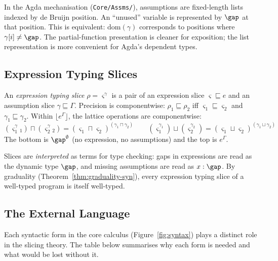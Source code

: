 \begin{remark}\label{rem:assms-mechanisation}
In the Agda mechanisation (\texttt{Core/Assms/}), assumptions are fixed-length lists indexed by de Bruijn position. An ``unused'' variable is represented by $\gap$ at that position. This is equivalent: $\mathrm{dom}(\gamma)$ corresponds to positions where $\gamma[i] \neq \gap$. The partial-function presentation is cleaner for exposition; the list representation is more convenient for Agda's dependent types.
\end{remark}

\subsection{Expression Typing Slices}
\label{sec:expression-typing-slices}

An \textit{expression typing slice} $\rho = \varsigma^\gamma$ is a pair of an expression slice $\varsigma \sqsubseteq e$ and an assumption slice $\gamma \sqsubseteq \Gamma$. Precision is componentwise: $\rho_1 \sqsubseteq \rho_2$ iff $\varsigma_1 \sqsubseteq \varsigma_2$ and $\gamma_1 \sqsubseteq \gamma_2$. Within $\lfloor e^\Gamma \rfloor$, the lattice operations are componentwise:
\[(\varsigma_1^\gamma_1) \sqcap (\varsigma_2^\gamma_2) = (\varsigma_1 \sqcap \varsigma_2)^{(\gamma_1 \sqcap \gamma_2)} \qquad (\varsigma_1^{\gamma_1}) \sqcup (\varsigma_2^{\gamma_2}) = (\varsigma_1 \sqcup \varsigma_2)^{(\gamma_1 \sqcup \gamma_2)}\]
The bottom is $\gap^\emptyset$ (no expression, no assumptions) and the top is $e^\Gamma$.

Slices are \textit{interpreted} as terms for type checking: gaps in expressions are read as the dynamic type $\gap$, and missing assumptions are read as $x : \gap$. By graduality (Theorem~\ref{thm:graduality-syn}), every expression typing slice of a well-typed program is itself well-typed.

\subsection{The External Language}
\label{sec:external-language}

Each syntactic form in the core calculus (Figure~\ref{fig:syntax}) plays a distinct role in the slicing theory. The table below summarises why each form is needed and what would be lost without it.

